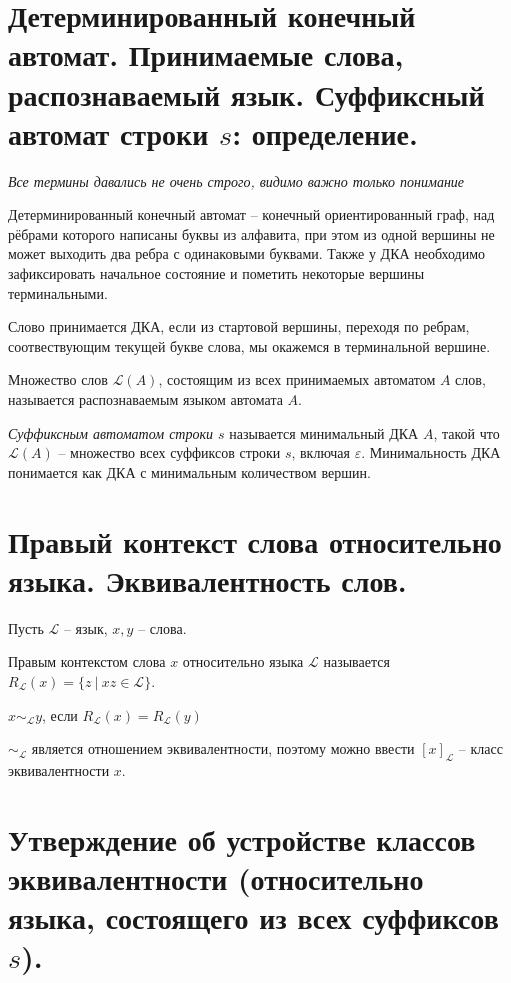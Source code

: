 \section{Детерминированный конечный автомат. Принимаемые слова, распознаваемый язык. Суффиксный автомат строки $s$: определение.}

\textit{Все термины давались не очень строго, видимо важно только понимание}

Детерминированный конечный автомат -- конечный ориентированный граф, над рёбрами которого написаны буквы из алфавита, при этом из одной вершины не может выходить два ребра с одинаковыми буквами. Также у ДКА необходимо зафиксировать начальное состояние и пометить некоторые вершины терминальными.

Слово принимается ДКА, если из стартовой вершины, переходя по ребрам, соотвествующим текущей букве слова, мы окажемся в терминальной вершине.

Множество слов $\mathcal{L}(A)$, состоящим из всех принимаемых автоматом $A$ слов, называется распознаваемым языком автомата $A$.

\textit{Суффиксным автоматом строки $s$} называется минимальный ДКА $A$, такой что $\mathcal{L}(A)$ -- множество всех суффиксов строки $s$, включая $\varepsilon$. Минимальность ДКА понимается как ДКА с минимальным количеством вершин.

\newpage{}

\section{Правый контекст слова относительно языка. Эквивалентность слов.}

Пусть $\mathcal{L}$ -- язык, $x, y$ -- слова.

Правым контекстом слова $x$ относительно языка $\mathcal{L}$ называется
$R_{\mathcal{L}}(x) = \{ z\ |\ xz \in \mathcal{L} \}$.

$x \sim_{\mathcal{L}} y$, если $R_{\mathcal{L}}(x) = R_{\mathcal{L}}(y)$

$\sim_{\mathcal{L}}$ является отношением эквивалентности, поэтому можно ввести $[x]_{\mathcal{L}}$ -- класс эквивалентности $x$. 

\newpage{}

\section{Утверждение об устройстве классов эквивалентности (относительно языка, состоящего из всех суффиксов $s$).}

